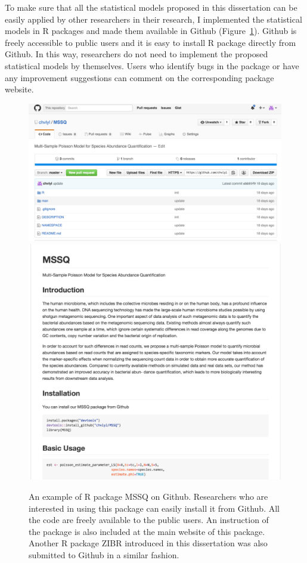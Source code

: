 To make sure that all the statistical models proposed in this dissertation can be easily applied by other researchers in their research, I implemented the statistical models in R packages and made them  available in Github (Figure~\ref{Github_MSSQ}). Github is freely accessible to public users and it is easy to install R package directly from Github. In this way, researchers do not need to implement the proposed statistical models by themselves. Users who identify bugs in the package or have any improvement suggestions can comment on the corresponding  package website. 

\begin{figure}[p]
	\centering
	{\includegraphics[scale=0.4,trim=0 0 0 0,clip]{Figure/F62_Github_MSSQ1.pdf}
	\includegraphics[scale=0.4,trim=0 0 0 0,clip]{Figure/F63_Github_MSSQ2.pdf}
		
	}
	\caption[An example of R packages distributed on Github]{An example of R package MSSQ on Github. Researchers who are interested in using this package can easily install it from Github. All the code are freely available to the public users. An instruction of the package is also included at the main website of this package. Another R package ZIBR introduced in this dissertation was also submitted to Github in a similar fashion.
	}
	\label{Github_MSSQ}
\end{figure}


